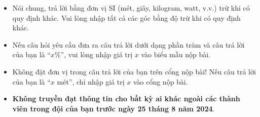 \documentclass[11pt]{article}
\begin{document}
\begin{itemize}
    \item Nói chung, trả lời bằng đơn vị SI (mét, giây, kilogram, watt, v.v.) trừ khi có quy định khác. Vui lòng nhập tất cả các góc bằng độ trừ khi có quy định khác.
    \item Nếu câu hỏi yêu cầu đưa ra câu trả lời dưới dạng phần trăm và câu trả lời của bạn là ``$x$\%”, vui lòng nhập giá trị $x$ vào biểu mẫu nộp bài.
    \item Không đặt đơn vị trong câu trả lời của bạn trên cổng nộp bài! Nếu câu trả lời của bạn là ``$x$ mét”, chỉ nhập giá trị $x$ vào cổng nộp bài.
    \item \textbf{Không truyền đạt thông tin cho bất kỳ ai khác ngoài các thành viên trong đội của bạn trước ngày 25 tháng 8 năm 2024}.
\end{itemize}

\newpage
\end{document}
